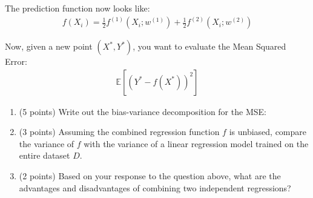 \documentclass[11pt]{article}
\begin{document}
The prediction function now looks like:
\begin{align*}
    {f(X_i)} = \frac{1}{2}{f^{(1)}(X_i; w^{(1)})} + \frac{1}{2}{f^{(2)}(X_i; w^{(2)})}
\end{align*}

Now, given a new point $(X^*, Y^*)$, you want to evaluate the Mean Squared Error:
\begin{align*}
    \mathbb{E}[(Y^* - {f(X^*)})^2]
\end{align*}
\begin{enumerate}[{(1)}]

\item (5 points) Write out the bias-variance decomposition for the MSE:

\begin{answertext}{6cm}{}
    
  
  
\end{answertext} 

\item (3 points) Assuming the combined regression function $f$ is unbiased, compare the variance of $f$ with the variance of a linear regression model trained on the entire dataset $D$. 

\begin{answertext}{6cm}{}
    
  
  
\end{answertext} 
\item (2 points) Based on your response to the question above, what are the advantages and disadvantages of combining two independent regressions?

\begin{answertext}{6cm}{}
    
  
  
\end{answertext} 
\end{enumerate}
\end{document}
